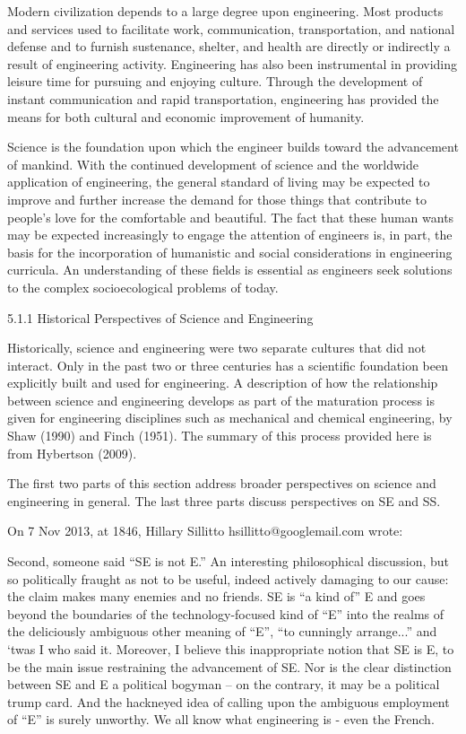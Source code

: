 Modern civilization depends to a large degree upon engineering. Most products and services used to facilitate work, communication, transportation, and national defense and to furnish sustenance, shelter, and health are directly or indirectly a result of engineering activity. Engineering has also been instrumental in providing leisure time for pursuing and enjoying culture. Through the development of instant communication and rapid transportation, engineering has provided the means for both cultural and economic improvement of humanity.

Science is the foundation upon which the engineer builds toward the advancement of mankind. With the continued development of science and the worldwide application of engineering, the general standard of living may be expected to improve and further increase the demand for those things that contribute to people’s love for the comfortable and beautiful. The fact that these human wants may be expected increasingly to engage the attention of engineers is, in part, the basis for the incorporation of humanistic and social considerations in engineering curricula. An understanding of these fields is essential as engineers seek solutions to the complex socioecological problems of today.

5.1.1 Historical Perspectives of Science and Engineering

Historically, science and engineering were two separate cultures that did not interact. Only in the past two or three centuries has a scientific foundation been explicitly built and used for engineering. A description of how the relationship between science and engineering develops as part of the maturation process is given for engineering disciplines such as mechanical and chemical engineering, by Shaw (1990) and Finch (1951). The summary of this process provided here is from Hybertson (2009).

The first two parts of this section address broader perspectives on science and engineering in general. The last three parts discuss perspectives on SE and SS.

On 7 Nov 2013, at 1846, Hillary Sillitto hsillitto@googlemail.com wrote:

Second, someone said ``SE is not E.''  An interesting philosophical discussion, but so politically fraught as not to be useful, indeed actively damaging to our cause: the claim makes many enemies and no friends. SE is ``a kind of'' E and goes beyond the boundaries of the technology-focused kind of “E” into the realms of the deliciously ambiguous other meaning of ``E'', ``to cunningly arrange...'' and ‘twas I who said it. Moreover, I believe this inappropriate notion that SE is E, to be the main issue restraining the advancement of SE. Nor is the clear distinction between SE and E a political bogyman – on the contrary, it may be a political trump card. And the hackneyed idea of calling upon the ambiguous employment of “E” is surely unworthy. We all know what engineering is - even the French.

